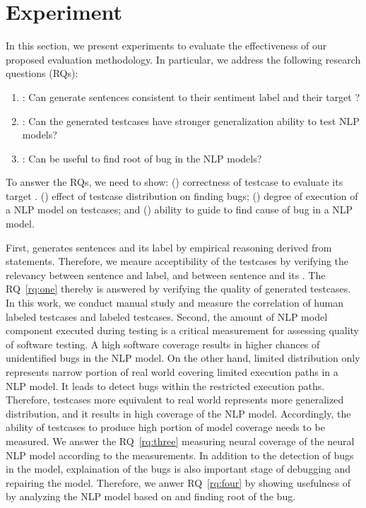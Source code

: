 \section{Experiment}
\label{sec:experiment}
%


In this section, we present experiments to evaluate the effectiveness
of our proposed evaluation methodology. In particular, we address the
following research questions (RQs):

\begin{enumerate}[label=\textbf{RQ\arabic*}]
\item \label{rq:one}: Can \tool generate sentences consistent to their
  sentiment label and their target \lc?
\item \label{rq:two}: Can the \tool generated testcases have stronger
  generalization ability to test NLP models?
\item \label{rq:three}: Can \tool be useful to find root of bug in the
  NLP models?
\end{enumerate}

To answer the RQs, we need to show: () correctness of testcase to
evaluate its target \lc.  () effect of testcase distribution on
finding bugs; () degree of execution of a NLP model on testcases;
and () ability to guide to find cause of bug in a NLP
model.

First, \tool generates sentences and its label by empirical reasoning
derived from \lc statements. Therefore, we meaure acceptibility of the
testcases by verifying the relevancy between sentence and label, and
between sentence and its \lc. The RQ~\ref{rq:one} thereby is answered
by verifying the quality of generated testcases. In this work, we
conduct manual study and measure the correlation of human labeled
testcases and \tool labeled testcases. Second, the amount of NLP model
component executed during testing is a critical measurement for
assessing quality of software testing. A high software coverage
results in higher chances of unidentified bugs in the NLP model. On
the other hand, limited distribution only represents narrow portion of
real world covering limited execution paths in a NLP model. It leads
to detect bugs within the restricted execution paths.  Therefore,
testcases more equivalent to real world represents more generalized
distribution, and it results in high coverage of the NLP model.
Accordingly, the ability of testcases to produce high portion of model
coverage needs to be measured. We answer the RQ~\ref{rq:three}
measuring neural coverage of the neural NLP model according to the
measurements. In addition to the detection of bugs in the model,
explaination of the bugs is also important stage of debugging and
repairing the model. Therefore, we anwer RQ~\ref{rq:four} by showing
usefulness of \tool by analyzing the NLP model based on \tool and
finding root of the bug.

